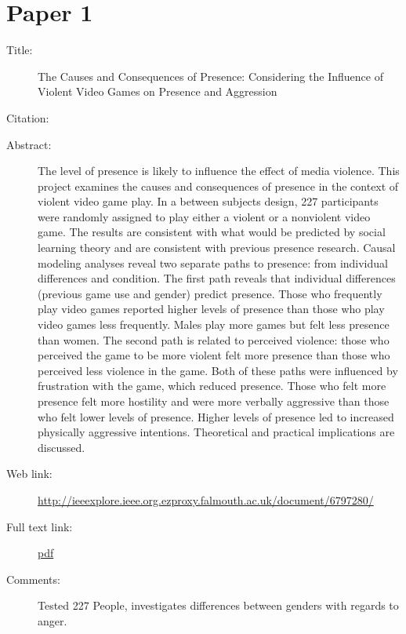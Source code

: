 \documentclass{scrartcl}
\begin{document}
\section*{Paper 1}
\begin{description}
\item[Title:] The Causes and Consequences of Presence: Considering the Influence of Violent Video Games on Presence and Aggression
\item[Citation:] \cite{influence}
\item[Abstract:] The level of presence is likely to influence the effect of media violence. This project examines the causes and consequences of presence in the context of violent video game play. In a between subjects design, 227 participants were randomly assigned to play either a violent or a nonviolent video game. The results are consistent with what would be predicted by social learning theory and are consistent with previous presence research. Causal modeling analyses reveal two separate paths to presence: from individual differences and condition. The first path reveals that individual differences (previous game use and gender) predict presence. Those who frequently play video games reported higher levels of presence than those who play video games less frequently. Males play more games but felt less presence than women. The second path is related to perceived violence: those who perceived the game to be more violent felt more presence than those who perceived less violence in the game. Both of these paths were influenced by frustration with the game, which reduced presence. Those who felt more presence felt more hostility and were more verbally aggressive than those who felt lower levels of presence. Higher levels of presence led to increased physically aggressive intentions. Theoretical and practical implications are discussed.
\item[Web link:] \url{http://ieeexplore.ieee.org.ezproxy.falmouth.ac.uk/document/6797280/}
\item[Full text link:] \url{pdf}
\item[Comments:] Tested 227 People, investigates differences between genders with regards to anger. 
\end{description}
\end{document}
